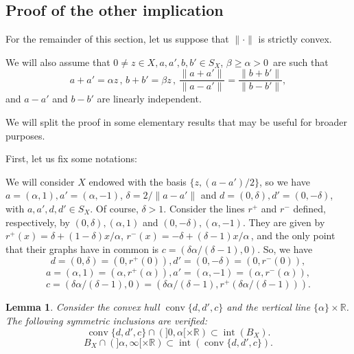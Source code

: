 \documentclass[12pt]{amsproc}
\newtheorem{lemma}[theorem]{Lemma}
\theoremstyle{remark}
\def\equi{=}
\def\interior{\operatorname{int}}
\def\conv{\operatorname{conv}}
\def\R{\mathbb R}
\begin{document}
\subsection{Proof of the other implication}

For the remainder of this section, let us suppose that $\|\cdot\|$ is strictly convex. 

\medskip

We will also assume that 
$0\neq z\in X, a, a', b, b'\in S_X$, $\beta\geq\alpha>0\,$ are such that 
$$a+a'=\alpha z\,,\, b+b'=\beta z\,,\, \frac{\|a+a'\|}{\|a-a'\|}=\frac{\|b+b'\|}{\|b-b'\|}, $$
and $a-a'$ and $b-b'$ are linearly independent. 

We will split the proof in some elementary results that may be useful for broader purposes. 

First, let us fix some notations: 

We will consider $X$ endowed with the basis $\{z, (a-a')/2\}$, so we have 
$a\equi(\alpha,1), a'\equi(\alpha,-1)$, $\delta=2/\|a-a'\|$ and 
$d\equi(0,\delta), d'\equi(0,-\delta)$, with $a, a', d, d'\in S_X$. Of course, 
$\delta>1$. Consider the lines $r^+$ and $r^-$ 
defined, respectively, by $(0,\delta), (\alpha,1)$ and $(0,-\delta), (\alpha,-1)$. They are given by $r^+(x)=\delta+(1-\delta)x/\alpha$, $r^-(x)=-\delta+(\delta - 1)x/\alpha\,$, and 
the only point that their graphs have in common is $c\equi(\delta\alpha/(\delta-1),0)$.
So, we have 
$$d\equi(0,\delta)\equi(0,r^+(0)), d'\equi(0,-\delta)\equi(0,r^-(0)),$$ 
$$a\equi(\alpha,1)\equi(\alpha,r^+(\alpha)), a'\equi(\alpha,-1)\equi(\alpha,r^-(\alpha)),$$ 
$$c\equi(\delta\alpha/(\delta-1),0)\equi(\delta\alpha/(\delta-1),r^+(\delta\alpha/(\delta-1))). $$

\begin{lemma}\label{traptrian}
Consider the convex hull $\conv\{d,d',c\}$ and the vertical line $\{\alpha\}\times\R$. The following {\em  symmetric} inclusions are verified: 
$$\conv\{d, d', c\}\cap(]0,\alpha[\times\R)\subset\interior(B_X).$$
$$B_X\cap(]\alpha,\infty[\times\R)\subset \interior(\conv\{d, d',c\}). $$
\end{lemma}
\end{document}
